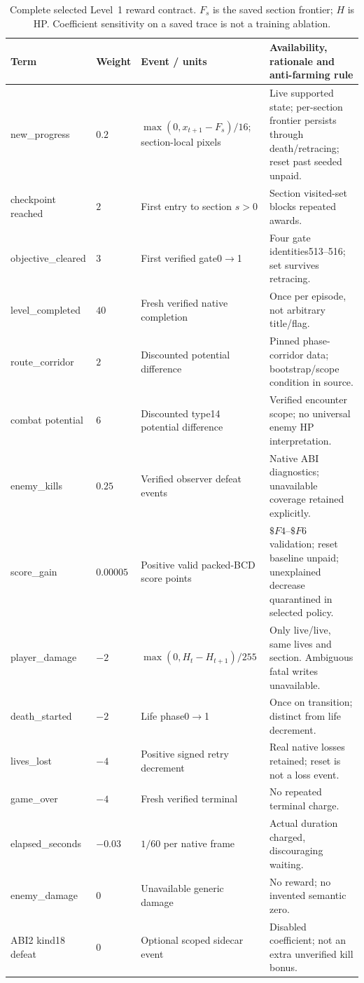 \documentclass[11pt,a4paper]{article}
\begin{document}
\begin{table}[ht]\small\centering
\begin{tabularx}{\linewidth}{@{}P{27mm}P{15mm}Y Y@{}}\toprule
Term & Weight & Event / units & Availability, rationale and anti-farming rule\\\midrule
new\_progress & $0.2$ & $\max(0,x_{t+1}-F_s)/16$; section-local pixels & Live supported state; per-section frontier persists through death/retracing; reset past seeded unpaid.\\
checkpoint reached & $2$ & First entry to section $s>0$ & Section visited-set blocks repeated awards.\\
objective\_cleared & $3$ & First verified gate0$\to$1 & Four gate identities513--516; set survives retracing.\\
level\_completed & $40$ & Fresh verified native completion & Once per episode, not arbitrary title/flag.\\
route\_corridor & $2$ & Discounted potential difference & Pinned phase-corridor data; bootstrap/scope condition in source.\\
combat potential & $6$ & Discounted type14 potential difference & Verified encounter scope; no universal enemy HP interpretation.\\
enemy\_kills & $0.25$ & Verified observer defeat events & Native ABI diagnostics; unavailable coverage retained explicitly.\\
score\_gain & $0.00005$ & Positive valid packed-BCD score points & $\$F4$--$\$F6$ validation; reset baseline unpaid; unexplained decrease quarantined in selected policy.\\
player\_damage & $-2$ & $\max(0,H_t-H_{t+1})/255$ & Only live/live, same lives and section. Ambiguous fatal writes unavailable.\\
death\_started & $-2$ & Life phase0$\to$1 & Once on transition; distinct from life decrement.\\
lives\_lost & $-4$ & Positive signed retry decrement & Real native losses retained; reset is not a loss event.\\
game\_over & $-4$ & Fresh verified terminal & No repeated terminal charge.\\
elapsed\_seconds & $-0.03$ & $1/60$ per native frame & Actual duration charged, discouraging waiting.\\
enemy\_damage & $0$ & Unavailable generic damage & No reward; no invented semantic zero.\\
ABI2 kind18 defeat & $0$ & Optional scoped sidecar event & Disabled coefficient; not an extra unverified kill bonus.\\\bottomrule
\end{tabularx}\caption{Complete selected Level~1 reward contract. $F_s$ is the saved section frontier; $H$ is HP. Coefficient sensitivity on a saved trace is not a training ablation.}
\end{table}
\end{document}
